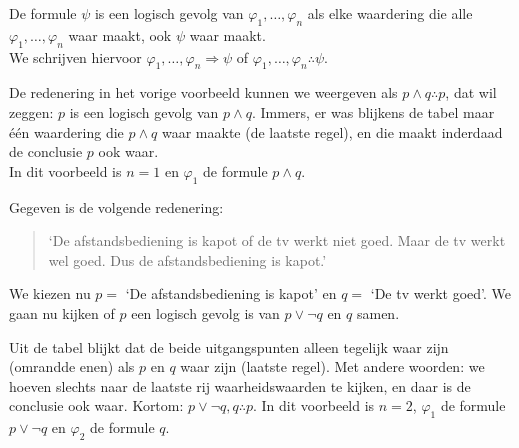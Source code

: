 \begin{definition}\label{def:gevolg}
De formule $\psi$ is een logisch gevolg van $\varphi_1,\ldots,\varphi_n$ als elke waardering die alle $\varphi_1,\ldots,\varphi_n$ waar maakt, ook $\psi$ waar maakt.\\
We schrijven hiervoor $\varphi_1,\ldots,\varphi_n\Rightarrow\psi$ of $\varphi_1,\ldots,\varphi_n\therefore\psi$.
\end{definition}

\begin{example}
De redenering in het vorige voorbeeld kunnen we weergeven als $p\land q\therefore p$, dat wil zeggen: $p$ is een logisch gevolg van $p\land q$. Immers, er was blijkens de tabel maar \'e\'en waardering die $p\land q$ waar maakte (de laatste regel), en die maakt inderdaad de conclusie $p$ ook waar.\\
In dit voorbeeld is $n=1$ en $\varphi_1$ de formule $p\land q$.
\end{example}

\begin{example}
Gegeven is de volgende redenering:
\begin{quote}
`De afstandsbediening is kapot of de tv werkt niet goed. Maar de tv werkt wel goed. Dus de afstandsbediening is kapot.'
\end{quote}
We kiezen nu $p=$ `De afstandsbediening is kapot' en $q=$ `De tv werkt goed'. We gaan nu kijken of $p$ een logisch gevolg is van $p\lor\neg q$ en $q$ samen.\\

\noindent
Uit de tabel blijkt dat de beide uitgangspunten alleen tegelijk waar zijn (omrandde enen) als $p$ en $q$ waar zijn (laatste regel). Met andere woorden: we hoeven slechts naar de laatste rij waarheidswaarden te kijken, en daar is de conclusie ook waar. Kortom: $p\lor\neg q,q\therefore p$. In dit voorbeeld is $n=2$, $\varphi_1$ de formule $p\lor\neg q$ en $\varphi_2$ de formule $q$.
\end{example}

